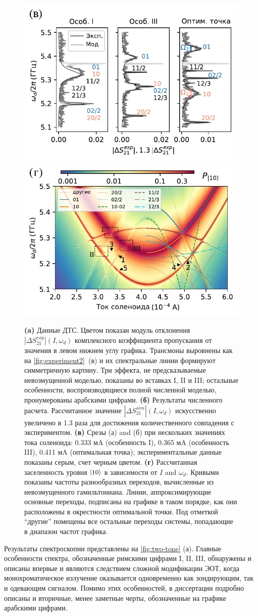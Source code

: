 \documentclass[14pt, a4paper]{extarticle}
\DeclarePairedDelimiter\ket{\lvert}{\rangle}
\begin{document}
\begin{figure}
	\includegraphics[width=.495\linewidth]{main_picture_slices}
	\includegraphics[width=.495\linewidth]{stationary}
	\caption{\textbf{(a)} 
		Данные ДТС. Цветом показан модуль отклонения $|\Delta S^{exp}_{21}| (I, \omega_d)$ комплексного коэффициента пропускания от значения в левом нижнем углу графика. 
		Трансмоны выровнены как на 
		\autoref{fig:experiment2}~(в) и их спектральные линии формируют симметричную картину. Три эффекта, не предсказываемые невозмущенной моделью, показаны во вставках I, II и III; остальные особенности, воспроизводящиеся полной численной моделью, пронумерованы арабскими цифрами. \textbf{(б)} Результаты численного расчета. Рассчитанное значение $|\Delta S^{sim}_{21}| (I, \omega_d)$ искусственно увеличено в 1.3 раза для достижения количественного совпадения с экспериментом.
		\textbf{(в)} Срезы (а) and (б) при нескольких значениях тока соленоида: 0.333 мA (особенность I), 0.365 мA (особенность III), 0.411 мA 
		(оптимальная точка); 
		экспериментальные данные показаны серым, счет черным цветом. \textbf{(г)} Рассчитанная заселенность  
		уровня $\ket{10}$ в зависимости от $I$ and $\omega_d$. Кривыми показаны частоты разнообразных переходов, вычисленные из невозмущенного гамильтониана. Линии, аппроксимирующие основные переходы, подписаны на графике в таком порядке, как они расположены в окрестности оптимальной точки. Под отметкой ``другие'' помещены все остальные переходы системы, попадающие в диапазон частот графика.}
	\label{fig:two-tone}
\end{figure}

Результаты спектроскопии представлены на \autoref{fig:two-tone} (а). Главные особенности спектра, обозначенные римскими цифрами I, II, III, обнаружены и описаны впервые и являются следствием сложной модификации ЭОТ, когда монохроматическое излучение оказывается одновременно как зондирующим, так и одевающим сигналом. Помимо этих особенностей, в диссертации подробно описаны и вторичные, менее заметные черты, обозначенные на графике арабскими цифрами.
\end{document}
